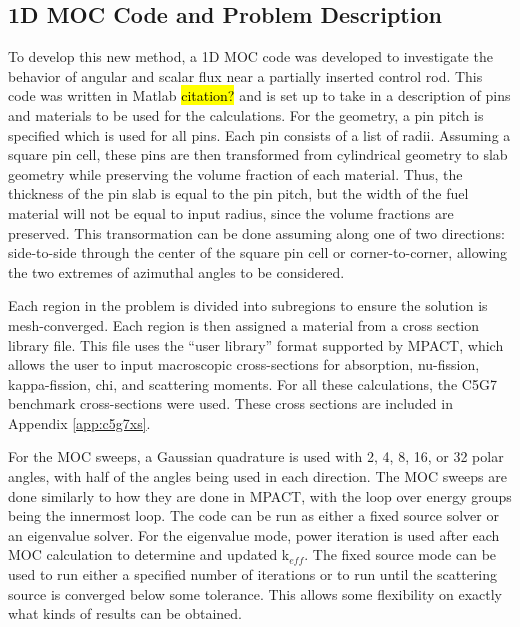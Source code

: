 \subsection{1D MOC Code and Problem Description}

To develop this new method, a 1D MOC code was developed to investigate the behavior of angular and scalar flux near a partially inserted control rod.  This code was written in Matlab \hl{citation?} and is set up to take in a description of pins and materials to be used for the calculations.  For the geometry, a pin pitch is specified which is used for all pins.  Each pin consists of a list of radii.  Assuming a square pin cell, these pins are then transformed from cylindrical geometry to slab geometry while preserving the volume fraction of each material.  Thus, the thickness of the pin slab is equal to the pin pitch, but the width of the fuel material will not be equal to input radius, since the volume fractions are preserved.  This transormation can be done assuming along one of two directions: side-to-side through the center of the square pin cell or corner-to-corner, allowing the two extremes of azimuthal angles to be considered.

Each region in the problem is divided into subregions to ensure the solution is mesh-converged.  Each region is then assigned a material from a cross section library file.  This file uses the ``user library'' format supported by MPACT, which allows the user to input macroscopic cross-sections for absorption, nu-fission, kappa-fission, chi, and scattering moments.  For all these calculations, the C5G7 benchmark cross-sections \cite{EELewisC5G72003,EELewisC5G7extended2005} were used.  These cross sections are included in Appendix \ref{app:c5g7xs}.

For the MOC sweeps, a Gaussian quadrature \cite{HandbookOfMathFunctions1972} is used with 2, 4, 8, 16, or 32 polar angles, with half of the angles being used in each direction.  The MOC sweeps are done similarly to how they are done in MPACT, with the loop over energy groups being the innermost loop.  The code can be run as either a fixed source solver or an eigenvalue solver.  For the eigenvalue mode, power iteration is used after each MOC calculation to determine and updated k$_{eff}$.  The fixed source mode can be used to run either a specified number of iterations or to run until the scattering source is converged below some tolerance.  This allows some flexibility on exactly what kinds of results can be obtained.

